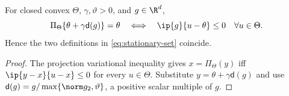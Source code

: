 \begin{lemma}\label{lem:residual-stationarity}
For closed convex $\Theta$, $\gamma,\vartheta>0$, and $g\in\R^d$,
\begin{equation}\label{eq:projection-stationarity-equivalence}
 \Pi_\Theta\{\theta+\gamma\mathsf d(g)\}=\theta
 \quad\Longleftrightarrow\quad
 \ip{g}{u-\theta}\le0\quad\forall u\in\Theta.
\end{equation}
Hence the two definitions in \eqref{eq:stationary-set} coincide.
\end{lemma}

\begin{proof}
The projection variational inequality gives
$x=\Pi_\Theta(y)$ iff $\ip{y-x}{u-x}\le0$ for every $u\in\Theta$.  Substitute $y=\theta+\gamma\mathsf d(g)$ and use
$\mathsf d(g)=g/\max\{\norm g_2,\vartheta\}$, a positive scalar multiple of $g$.
\end{proof}
